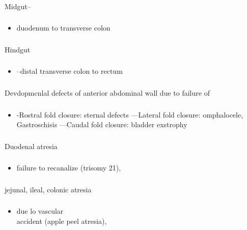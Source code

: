 \documentclass[11pt]{beamer}
\begin{document}
\begin{frame}
 \frametitle{}
Midgut–
\end{frame}

\begin{frame}
 \frametitle{}
\begin{itemize}
\item{duodenum to transverse colon}
\end{itemize}
\end{frame}

\begin{frame}
 \frametitle{}
 Hindgut
\end{frame}

\begin{frame}
 \frametitle{}
\begin{itemize}
\item{–distal transverse colon to rectum}
\end{itemize}
\end{frame}

\begin{frame}
 \frametitle{}
Devdopmcnlal defects of anterior abdominal wall due to failure of 
\end{frame}

\begin{frame}
 \frametitle{}
\begin{itemize}
\item{-Rostral fold closure: sternal defects —Lateral fold closure: omphalocele,
Gastroschisis —Caudal fold closure: bladder exstrophy}
\end{itemize}
\end{frame}

\begin{frame}
 \frametitle{}
Duodenal atresia
\end{frame}

\begin{frame}
 \frametitle{}
\begin{itemize}
\item{failure to recanalize (trisomy 21),}
\end{itemize}
\end{frame}

\begin{frame}
 \frametitle{}
jejunal, ileal, colonic atresia
\end{frame}

\begin{frame}
 \frametitle{}
\begin{itemize}
\item{due lo vascular \\ accident (apple peel atresia),}
\end{itemize}
\end{frame}
\end{document}
